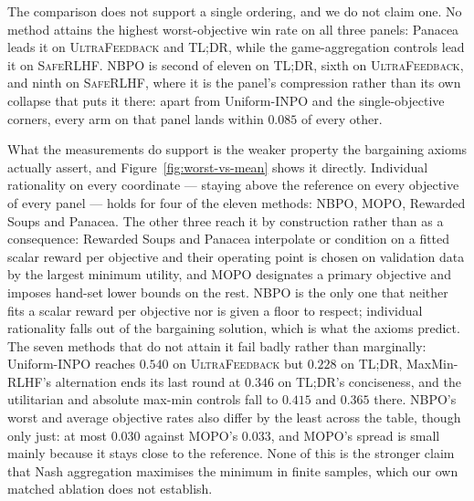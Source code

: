 \documentclass{article}
\theoremstyle{remark}
\theoremstyle{plain}
\newcommand{\NBPO}{\textsc{NBPO}}
\begin{document}
The comparison does not support a single ordering, and we do not claim one. No method attains the
highest worst-objective win rate on all three panels: Panacea leads it on \textsc{UltraFeedback}
and \textsc{TL;DR}, while the game-aggregation controls lead it on \textsc{SafeRLHF}. \NBPO{} is
second of eleven on \textsc{TL;DR}, sixth on \textsc{UltraFeedback}, and ninth on
\textsc{SafeRLHF}, where it is the panel's compression rather than its own collapse that puts it
there: apart from Uniform-INPO and the single-objective corners, every arm on that panel lands
within $0.085$ of every other.

What the measurements do support is the weaker property the bargaining axioms actually assert,
and Figure~\ref{fig:worst-vs-mean} shows it directly. Individual rationality on every coordinate --- staying above the reference on every objective of
every panel --- holds for four of the eleven methods: \NBPO{}, MOPO, Rewarded Soups and Panacea.
The other three reach it by construction rather than as a consequence: Rewarded Soups and Panacea
interpolate or condition on a fitted scalar reward per objective and their operating point is
chosen on validation data by the largest minimum utility, and MOPO designates a primary objective
and imposes hand-set lower bounds on the rest. \NBPO{} is the only one that neither fits a scalar
reward per objective nor is given a floor to respect; individual rationality falls out of the
bargaining solution, which is what the axioms predict. The seven methods that do not attain
it fail badly rather than marginally: Uniform-INPO reaches $0.540$ on \textsc{UltraFeedback} but
$0.228$ on \textsc{TL;DR}, MaxMin-RLHF's alternation ends its last round at $0.346$ on
\textsc{TL;DR}'s conciseness, and the utilitarian and absolute max-min controls fall to $0.415$ and
$0.365$ there. \NBPO{}'s worst and average objective rates also differ by the least across the
table, though only just: at most $0.030$ against MOPO's $0.033$, and MOPO's spread is small mainly
because it stays close to the reference. None of this is the stronger claim that Nash aggregation
maximises the minimum in finite samples, which our own matched ablation does not establish.
\end{document}
